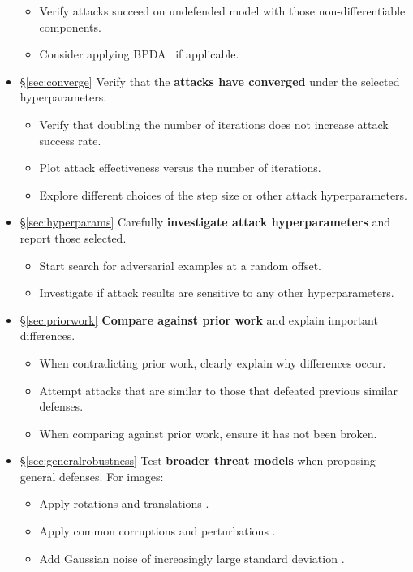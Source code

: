 \documentclass{article} %
\begin{document}
\begin{itemize}[leftmargin=*]
\begin{itemize}[leftmargin=*]
  \item Verify attacks succeed on undefended model with those non-differentiable components.
  \item Consider applying BPDA~\citep{athalye2018obfuscated} if applicable.
  \end{itemize}
\item \S\ref{sec:converge} Verify that the \textbf{attacks have converged} under the selected hyperparameters.
  \begin{itemize}[leftmargin=*]
  \item Verify that doubling the number of iterations does not increase attack success rate.
  \item Plot attack effectiveness versus the number of iterations.
  \item Explore different choices of the step size or other attack hyperparameters.
  \end{itemize}
\item \S\ref{sec:hyperparams} Carefully \textbf{investigate attack hyperparameters} and report those selected.
  \begin{itemize}[leftmargin=*]
  \item Start search for adversarial examples at a random offset.
  \item Investigate if attack results are sensitive to any other hyperparameters.
  \end{itemize}
  \item \S\ref{sec:priorwork} \textbf{Compare against prior work} and explain important differences.
  \begin{itemize}[leftmargin=*]
  \item When contradicting prior work, clearly explain why differences occur.
  \item Attempt attacks that are similar to those that defeated previous similar defenses.
  \item When comparing against prior work, ensure it has not been broken.
  \end{itemize}
\item \S\ref{sec:generalrobustness} Test \textbf{broader threat models} when proposing general defenses. For images:
  \begin{itemize}[leftmargin=*]
  \item Apply rotations and translations \citep{engstrom2017rotation}.
  \item Apply common corruptions and perturbations \citep{hendrycks2018benchmarking}.
  \item Add Gaussian noise of increasingly large standard deviation \citep{ford2019adversarial}.
  \end{itemize}
  

\end{itemize}
\end{document}

